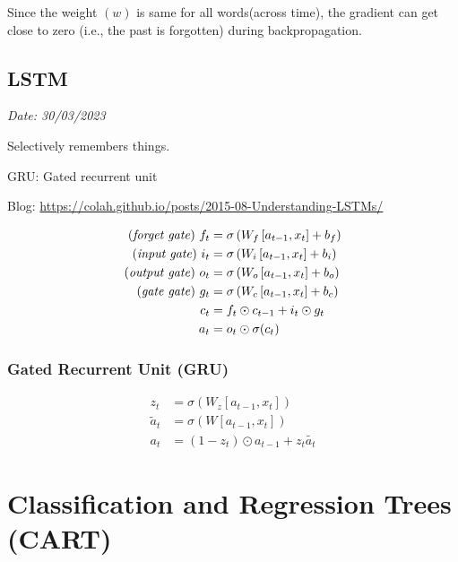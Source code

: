 \documentclass[11pt]{article}
\begin{document}
Since the weight $(w)$ is same for all words(across time), the gradient can get close to zero (i.e., the past is forgotten) during backpropagation.

\subsection{LSTM}
\label{sec:lstm}

\textit{Date: 30/03/2023}

\noindent Selectively remembers things.

\noindent GRU: Gated recurrent unit

\noindent Blog: \url{https://colah.github.io/posts/2015-08-Understanding-LSTMs/}

\begin{align*}
\text{(\textit{forget gate})  }  f_t &= \sigma \left( W_f \left[ a_{t-1}, x_t \right] + b_f \right) \\
\text{(\textit{input gate})  }    i_t &= \sigma \left( W_i \left[ a_{t-1}, x_t \right] + b_i \right) \\
\text{(\textit{output gate})  }    o_t &= \sigma \left( W_o \left[ a_{t-1}, x_t \right] + b_o \right) \\
\text{(\textit{gate gate})  }    g_t &= \sigma \left( W_c \left[ a_{t-1}, x_t \right] + b_c \right) \\
  c_t &= f_t \odot c_{t-1} + i_t \odot g_t \\
  a_t &= o_t \odot \sigma (c_t)
\end{align*}

\subsubsection{Gated Recurrent Unit (GRU)}
\label{sec:gated-recurrent-unit}

\begin{align*}
  z_t &= \sigma \left( W_z \left[ a_{t-1}, x_t \right] \right) \\
  \tilde{a}_t &= \sigma \left( W \left[ a_{t-1}, x_t \right] \right) \\
  a_t &= (1 - z_t) \odot a_{t-1} + z_t \tilde{a_t}
\end{align*}


\section{Classification and Regression Trees (CART)}
\label{sec:class-regr-trees}
\end{document}
